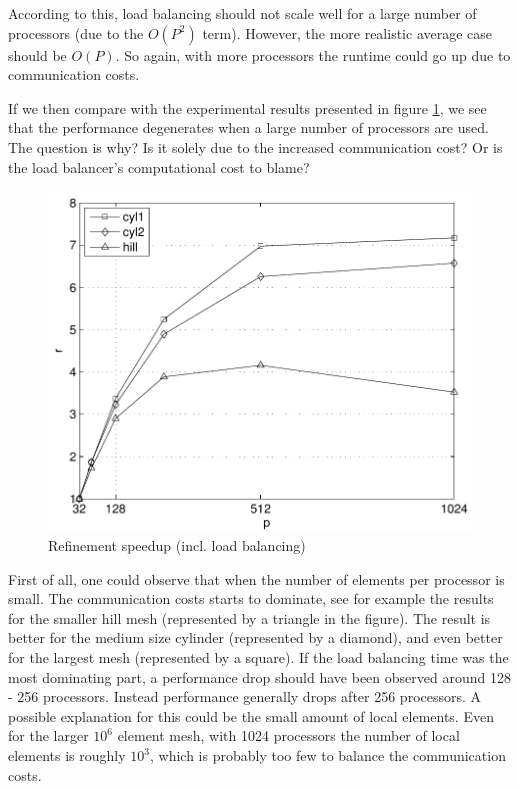 According to this, load balancing should not scale well for a large
number of processors (due to the $O(P^2)$ term). However, the more
realistic average case should be $O(P)$. So again, with more
processors the runtime could go up due to communication costs.

If we then compare with the experimental results presented in figure
\ref{hoffman-4:fig:refsp}, we see that the performance degenerates when a large
number of processors are used. The question is why? Is it solely due
to the increased communication cost? Or is the load balancer's
computational cost to blame?
\begin{figure}[hbt]



  \begin{center}
      \includegraphics[width=0.55\columnwidth]{chapters/hoffman-4/pdf/speedup.pdf}
      \caption{Refinement speedup (incl. load balancing)}
      \label{hoffman-4:fig:refsp}
  \end{center}
\end{figure}

First of all, one could observe that when the number of elements per
processor is small. The communication costs starts to dominate, see
for example the results for the smaller hill mesh (represented by a
triangle in the figure). The result is better for the medium size
cylinder (represented by a diamond), and even better for the largest
mesh (represented by a square). If the load balancing time was the
most dominating part, a performance drop should have been observed
around 128 - 256 processors. Instead performance generally drops after
256 processors. A possible explanation for this could be the small
amount of local elements. Even for the larger $10^6$ element mesh,
with 1024 processors the number of local elements is roughly $10^3$,
which is probably too few to balance the communication costs.

